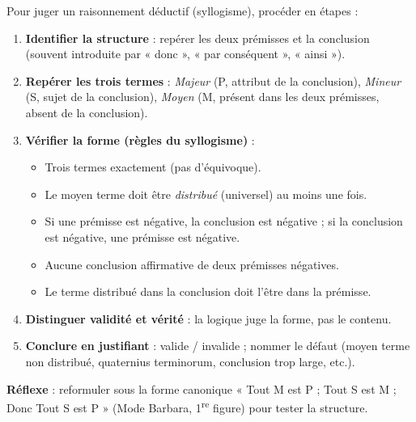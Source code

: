 \documentclass[11pt]{article}
\begin{document}
\begin{methode}
Pour juger un raisonnement déductif (syllogisme), procéder en étapes :
\begin{enumerate}
\item \textbf{Identifier la structure} : repérer les deux prémisses et la conclusion (souvent introduite par « donc », « par conséquent », « ainsi »).
\item \textbf{Repérer les trois termes} : \emph{Majeur} (P, attribut de la conclusion), \emph{Mineur} (S, sujet de la conclusion), \emph{Moyen} (M, présent dans les deux prémisses, absent de la conclusion).
\item \textbf{Vérifier la forme (règles du syllogisme)} :
  \begin{itemize}
  \item Trois termes exactement (pas d'équivoque).
  \item Le moyen terme doit être \emph{distribué} (universel) au moins une fois.
  \item Si une prémisse est négative, la conclusion est négative ; si la conclusion est négative, une prémisse est négative.
  \item Aucune conclusion affirmative de deux prémisses négatives.
  \item Le terme distribué dans la conclusion doit l'être dans la prémisse.
  \end{itemize}
\item \textbf{Distinguer validité et vérité} : la logique juge la forme, pas le contenu.
\item \textbf{Conclure en justifiant} : valide / invalide ; nommer le défaut (moyen terme non distribué, quaternius terminorum, conclusion trop large, etc.).
\end{enumerate}
\textbf{Réflexe} : reformuler sous la forme canonique « Tout M est P ; Tout S est M ; Donc Tout S est P » (Mode Barbara, 1\textsuperscript{re} figure) pour tester la structure.
\end{methode}
\end{document}
